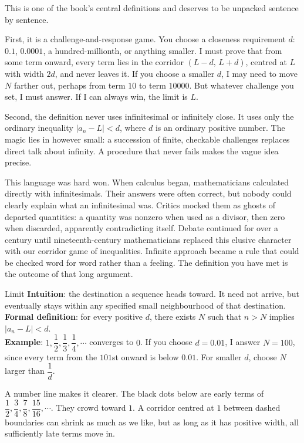 This is one of the book's central definitions and deserves to be unpacked sentence by sentence.

First, it is a challenge-and-response game. You choose a closeness requirement $d$: $0.1$, $0.0001$, a hundred-millionth, or anything smaller. I must prove that from some term onward, every term lies in the corridor $(L-d,\,L+d)$, centred at $L$ with width $2d$, and never leaves it. If you choose a smaller $d$, I may need to move $N$ farther out, perhaps from term $10$ to term $10000$. But whatever challenge you set, I must answer. If I can always win, the limit is $L$.

Second, the definition never uses infinitesimal or infinitely close. It uses only the ordinary inequality $|a_n-L|<d$, where $d$ is an ordinary positive number. The magic lies in however small: a succession of finite, checkable challenges replaces direct talk about infinity. A procedure that never fails makes the vague idea precise.

This language was hard won. When calculus began, mathematicians calculated directly with infinitesimals. Their answers were often correct, but nobody could clearly explain what an infinitesimal was. Critics mocked them as ghosts of departed quantities: a quantity was nonzero when used as a divisor, then zero when discarded, apparently contradicting itself. Debate continued for over a century until nineteenth-century mathematicians replaced this elusive character with our corridor game of inequalities. Infinite approach became a rule that could be checked word for word rather than a feeling. The definition you have met is the outcome of that long argument.

\begin{shuyu}{Limit}
\textbf{Intuition}: the destination a sequence heads toward. It need not arrive, but eventually stays within any specified small neighbourhood of that destination.\\
\textbf{Formal definition}: for every positive $d$, there exists $N$ such that $n>N$ implies $|a_n-L|<d$.\\
\textbf{Example}: $1,\dfrac{1}{2},\dfrac{1}{3},\dfrac{1}{4},\cdots$ converges to $0$. If you choose $d=0.01$, I answer $N=100$, since every term from the $101$st onward is below $0.01$. For smaller $d$, choose $N$ larger than $\dfrac{1}{d}$.
\end{shuyu}

A number line makes it clearer. The black dots below are early terms of $\dfrac{1}{2},\dfrac{3}{4},\dfrac{7}{8},\dfrac{15}{16},\cdots$. They crowd toward $1$. A corridor centred at $1$ between dashed boundaries can shrink as much as we like, but as long as it has positive width, all sufficiently late terms move in.

